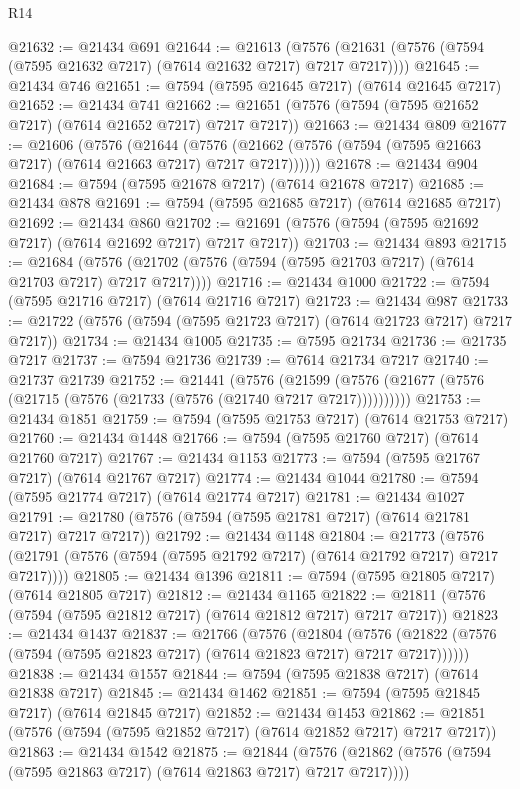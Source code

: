 \begin{lexlean}{R14}
\begin{coremodule}
@21632 := @21434 @691
@21644 := @21613
    (@7576 (@21631 (@7576 (@7594 (@7595 @21632 @7217) (@7614 @21632 @7217) @7217 @7217))))
@21645 := @21434 @746
@21651 := @7594 (@7595 @21645 @7217) (@7614 @21645 @7217)
@21652 := @21434 @741
@21662 := @21651 (@7576 (@7594 (@7595 @21652 @7217) (@7614 @21652 @7217) @7217 @7217))
@21663 := @21434 @809
@21677 := @21606
    (@7576
      (@21644
        (@7576 (@21662 (@7576 (@7594 (@7595 @21663 @7217) (@7614 @21663 @7217) @7217 @7217))))))
@21678 := @21434 @904
@21684 := @7594 (@7595 @21678 @7217) (@7614 @21678 @7217)
@21685 := @21434 @878
@21691 := @7594 (@7595 @21685 @7217) (@7614 @21685 @7217)
@21692 := @21434 @860
@21702 := @21691 (@7576 (@7594 (@7595 @21692 @7217) (@7614 @21692 @7217) @7217 @7217))
@21703 := @21434 @893
@21715 := @21684
    (@7576 (@21702 (@7576 (@7594 (@7595 @21703 @7217) (@7614 @21703 @7217) @7217 @7217))))
@21716 := @21434 @1000
@21722 := @7594 (@7595 @21716 @7217) (@7614 @21716 @7217)
@21723 := @21434 @987
@21733 := @21722 (@7576 (@7594 (@7595 @21723 @7217) (@7614 @21723 @7217) @7217 @7217))
@21734 := @21434 @1005
@21735 := @7595 @21734
@21736 := @21735 @7217
@21737 := @7594 @21736
@21739 := @7614 @21734 @7217
@21740 := @21737 @21739
@21752 := @21441
    (@7576 (@21599 (@7576 (@21677 (@7576 (@21715 (@7576 (@21733 (@7576 (@21740 @7217 @7217))))))))))
@21753 := @21434 @1851
@21759 := @7594 (@7595 @21753 @7217) (@7614 @21753 @7217)
@21760 := @21434 @1448
@21766 := @7594 (@7595 @21760 @7217) (@7614 @21760 @7217)
@21767 := @21434 @1153
@21773 := @7594 (@7595 @21767 @7217) (@7614 @21767 @7217)
@21774 := @21434 @1044
@21780 := @7594 (@7595 @21774 @7217) (@7614 @21774 @7217)
@21781 := @21434 @1027
@21791 := @21780 (@7576 (@7594 (@7595 @21781 @7217) (@7614 @21781 @7217) @7217 @7217))
@21792 := @21434 @1148
@21804 := @21773
    (@7576 (@21791 (@7576 (@7594 (@7595 @21792 @7217) (@7614 @21792 @7217) @7217 @7217))))
@21805 := @21434 @1396
@21811 := @7594 (@7595 @21805 @7217) (@7614 @21805 @7217)
@21812 := @21434 @1165
@21822 := @21811 (@7576 (@7594 (@7595 @21812 @7217) (@7614 @21812 @7217) @7217 @7217))
@21823 := @21434 @1437
@21837 := @21766
    (@7576
      (@21804
        (@7576 (@21822 (@7576 (@7594 (@7595 @21823 @7217) (@7614 @21823 @7217) @7217 @7217))))))
@21838 := @21434 @1557
@21844 := @7594 (@7595 @21838 @7217) (@7614 @21838 @7217)
@21845 := @21434 @1462
@21851 := @7594 (@7595 @21845 @7217) (@7614 @21845 @7217)
@21852 := @21434 @1453
@21862 := @21851 (@7576 (@7594 (@7595 @21852 @7217) (@7614 @21852 @7217) @7217 @7217))
@21863 := @21434 @1542
@21875 := @21844
    (@7576 (@21862 (@7576 (@7594 (@7595 @21863 @7217) (@7614 @21863 @7217) @7217 @7217))))

\end{coremodule}
\end{lexlean}

